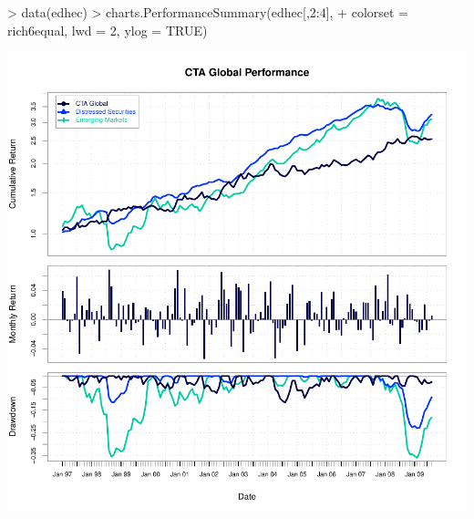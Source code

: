 \documentclass[12pt,letterpaper,english]{article}
\begin{document}
\begin{Schunk}
\begin{Sinput}
> data(edhec)
> charts.PerformanceSummary(edhec[,2:4],
+ colorset = rich6equal, lwd = 2, ylog = TRUE)
\end{Sinput}
\end{Schunk}
\includegraphics{LoSharpe-003}
\end{document}
